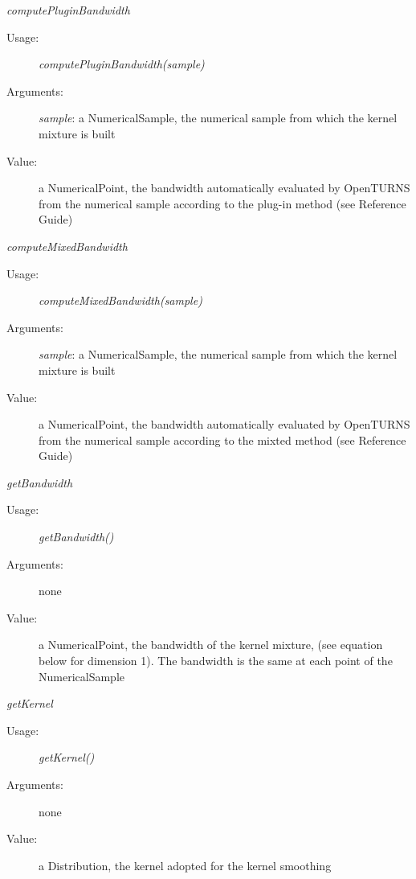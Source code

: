 \begin{description}
\begin{description}
\item \textit{computePluginBandwidth}
\begin{description}
\item[Usage:] \textit{computePluginBandwidth(sample)}
\item[Arguments:] \textit{sample}: a NumericalSample, the numerical sample from which the kernel mixture is built
\item[Value:] a NumericalPoint, the bandwidth automatically evaluated by OpenTURNS from the numerical sample according to the plug-in method (see Reference Guide)
\end{description}
\bigskip

\item \textit{computeMixedBandwidth}
\begin{description}
\item[Usage:] \textit{computeMixedBandwidth(sample)}
\item[Arguments:] \textit{sample}: a NumericalSample, the numerical sample from which the kernel mixture is built
\item[Value:] a NumericalPoint, the bandwidth automatically evaluated by OpenTURNS from the numerical sample according to the mixted method (see Reference Guide)
\end{description}
\bigskip

\item \textit{getBandwidth}
\begin{description}
\item[Usage:] \textit{getBandwidth()}
\item[Arguments:] none
\item[Value:] a NumericalPoint, the bandwidth of the kernel mixture, (see equation below for dimension 1). The bandwidth is the same at each point of the NumericalSample
\end{description}
\bigskip

\item \textit{getKernel}
\begin{description}
\item[Usage:] \textit{getKernel()}
\item[Arguments:] none
\item[Value:] a Distribution, the kernel adopted for the kernel smoothing
\end{description}


\end{description}


\end{description}
